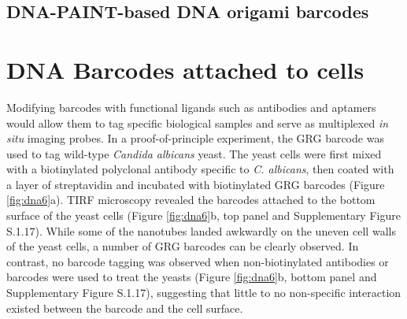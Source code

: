 \subsection{DNA-PAINT-based DNA origami barcodes}

\section{DNA Barcodes attached to cells}
Modifying barcodes with functional ligands such as antibodies and aptamers 
would allow them to tag specific biological samples and serve as multiplexed \textit{in situ} imaging probes. In a proof-of-principle experiment, the GRG barcode was used to 
tag wild-type \textit{Candida albicans} yeast. The yeast cells were first mixed with a biotinylated 
polyclonal antibody specific to \textit{C. albicans}, then coated with a layer of streptavidin and  incubated with biotinylated GRG barcodes (Figure \ref{fig:dna6}a). TIRF microscopy revealed 
the barcodes attached to the bottom surface of the yeast cells (Figure  \ref{fig:dna6}b, top panel and 
Supplementary Figure S.1.17). While some of the nanotubes landed awkwardly on the uneven cell walls of 
the yeast cells, a number of GRG barcodes can be clearly observed. In contrast, no 
barcode tagging was observed when non-biotinylated antibodies or barcodes were used to 
treat the yeasts (Figure  \ref{fig:dna6}b, bottom panel and Supplementary Figure 
S.1.17), suggesting that little to no non-specific interaction existed between the barcode and the cell surface. 

